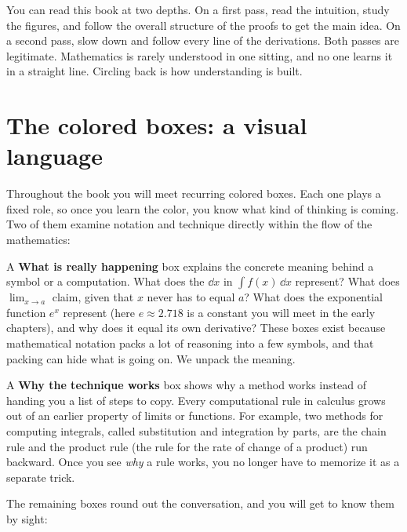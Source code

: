 \begin{intuitionbox}
You can read this book at two depths. On a first pass, read the intuition, study the figures,
and follow the overall structure of the proofs to get the main idea. On a second pass, slow down and follow every line
of the derivations. Both passes are legitimate. Mathematics is rarely understood in one sitting, and
no one learns it in a straight line. Circling back is how understanding is built.
\end{intuitionbox}

\section*{The colored boxes: a visual language}

Throughout the book you will meet recurring colored boxes. Each one plays a fixed role, so once you
learn the color, you know what kind of thinking is coming. Two of them examine notation
and technique directly within the flow of the mathematics:

\begin{happeningbox}
A \textbf{What is really happening} box explains the concrete meaning behind a symbol or a computation. What
does the $\dd x$ in $\int f(x)\,\dd x$ represent? What does
$\lim_{x\to a}$ claim, given that $x$ never has to equal $a$? What does the exponential function
$e^x$ represent (here $e \approx 2.718$ is a constant you will meet in the early chapters), and why
does it equal its own derivative? These boxes exist because mathematical notation packs a lot of reasoning into a few symbols, and
that packing can hide what is going on. We unpack the meaning.
\end{happeningbox}

\begin{whybox}
A \textbf{Why the technique works} box shows why a method works instead of handing you a list of steps to copy.
Every computational rule in calculus grows out of an earlier property of limits or functions.
For example, two methods for computing integrals, called substitution and integration by parts, are
the chain rule and the product rule (the rule for the rate of change of a product) run backward.
Once you see \emph{why} a rule works, you no longer have to memorize it as a separate trick.
\end{whybox}

The remaining boxes round out the conversation, and you will get to know them by sight:

